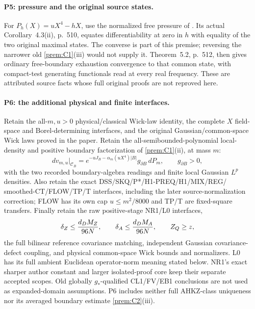 \documentclass[11pt]{article}
\theoremstyle{plain}
\theoremstyle{definition}
\theoremstyle{remark}
\newcommand{\cC}{\mathcal{C}}
\begin{document}
\paragraph{P5: pressure and the original source states.}
For $P_h(X)=uX^4-hX$, use the normalized free pressure of
\cite[Proposition~2.1 and the remark after (2.3), pp.~502--503]{FS1977}.
Its actual Corollary~4.3(ii), p.~510, equates differentiability at zero in
$h$ with equality of the two original maximal states. The converse is
part of this premise; reversing the narrower old
\ref{prem:C1}(iii) would not supply it. Theorem~5.2, p.~512, then gives
ordinary free-boundary exhaustion convergence to that common state, with
compact-test generating functionals read at every real frequency.
These are attributed source facts whose full original proofs are not
reproved here.

\paragraph{P6: the additional physical and finite interfaces.}
Retain the all-$m,u>0$ physical/classical Wick-law identity, the complete
$X$ field-space and Borel-determining interfaces, and the original
Gaussian/common-space Wick laws proved in the paper. Retain the
all-semibounded-polynomial local-density and positive boundary
factorization of \ref{prem:C1}(ii), at mass $m$:
\begin{equation}\label{vqal:P6density}
 d v_{m,u}|_{\cC_B}
  =e^{-uJ_B-\alpha_m(uX^4)|B|}g_{\partial B}\,dP_m,
 \qquad g_{\partial B}>0,
\end{equation}
with the two recorded boundary-algebra readings and finite local Gaussian
$L^p$ densities. Also retain the exact DSS/SKQ/P*/H1-PREQ/H1/MIX/REG/
smoothed-CT/FLOW/TP/T interfaces, including the later source-normalization
correction; FLOW has its own cap $u\le m^2/8000$ and TP/T are fixed-square
transfers. Finally retain the raw positive-stage NR1/L0 interfaces,
\begin{equation}\label{vqal:P6raw}
 \delta_Z\le {d_D M_Z\over96N},\qquad
 \delta_A\le {d_D M_A\over96N},\qquad Z_Q\ge z,
\end{equation}
the full bilinear reference covariance matching, independent Gaussian
covariance-defect coupling, and physical common-space Wick bounds and
normalizers. L0 has its full ambient Euclidean operator-norm meaning
stated below. NR1's exact sharper author constant and larger isolated-proof
core keep their separate accepted scopes. Old globally $g_*$-qualified
CL1/FV/EB1 conclusions are not used as expanded-domain assumptions.
P6 includes neither full AHKZ-class uniqueness nor its averaged boundary
estimate \ref{prem:C2}(iii).
\end{document}
